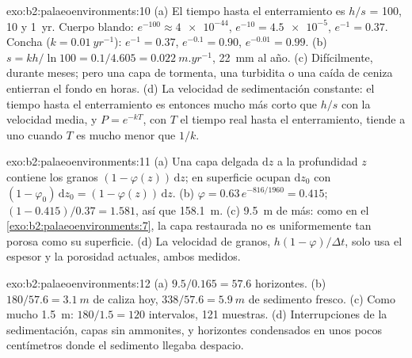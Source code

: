 \begin{solution}{exo:b2:palaeoenvironments:10}
(a) El tiempo hasta el enterramiento es $h/s$ = 100, 10 y \qty{1}{yr}. Cuerpo blando: $e^{-100} \approx
\num{4e-44}$, $e^{-10} = \num{4.5e-5}$, $e^{-1} = 0.37$. Concha ($k = \qty{0.01}{yr^{-1}}$):
$e^{-1} = 0.37$, $e^{-0.1} = 0.90$, $e^{-0.01} = 0.99$. (b) $s = kh/\ln 100 = 0.1/4.605 =
\qty{0.022}{m.yr^{-1}}$, \qty{22}{mm} al año. (c) Difícilmente, durante meses; pero una capa de tormenta, una
turbidita o una caída de ceniza entierran el fondo en horas. (d) La velocidad de sedimentación constante: el
tiempo hasta el enterramiento es entonces mucho más corto que $h/s$ con la velocidad media, y $P = e^{-kT}$, con $T$
el tiempo real hasta el enterramiento, tiende a uno cuando $T$ es mucho menor que $1/k$.
\end{solution}

\begin{solution}{exo:b2:palaeoenvironments:11}
(a) Una capa delgada $\mathrm dz$ a la profundidad $z$ contiene los granos $(1 - \varphi(z))\,\mathrm dz$;
en superficie ocupan $\mathrm dz_0$ con $(1 - \varphi_0)\,\mathrm dz_0 = (1 -
\varphi(z))\,\mathrm dz$. (b) $\varphi = 0.63\,e^{-816/1960} = 0.415$; $(1 - 0.415)/0.37 =
1.581$, así que \qty{158.1}{m}. (c) \qty{9.5}{m} de más: como en el \cref{exo:b2:palaeoenvironments:7},
la capa restaurada no es uniformemente tan porosa como su superficie. (d) La velocidad de granos,
$h(1-\varphi)/\Delta t$, solo usa el espesor y la porosidad actuales, ambos medidos.
\end{solution}

\begin{solution}{exo:b2:palaeoenvironments:12}
(a) $9.5/0.165 = 57.6$ horizontes. (b) $180/57.6 = \qty{3.1}{m}$ de caliza hoy, $338/57.6 =
\qty{5.9}{m}$ de sedimento fresco. (c) Como mucho \qty{1.5}{m}: $180/1.5 = 120$ intervalos, 121
muestras. (d) Interrupciones de la sedimentación, capas sin ammonites, y horizontes condensados en
unos pocos centímetros donde el sedimento llegaba despacio.
\end{solution}

